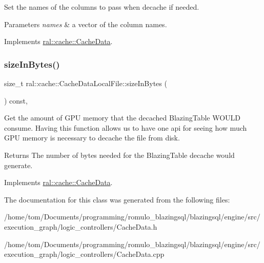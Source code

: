 Set the names of the columns to pass when decache if needed. 
\begin{DoxyParams}{Parameters}
{\em names} & a vector of the column names. \\
\hline
\end{DoxyParams}


Implements \hyperlink{classral_1_1cache_1_1CacheData_a3bb1623a4266ba7c961d325023ff13c6}{ral\+::cache\+::\+Cache\+Data}.

\mbox{\label{classral_1_1cache_1_1CacheDataLocalFile_ab0853eca16df1149f4ac0efbf3faa556}} 
\subsubsection{\texorpdfstring{size\+In\+Bytes()}{sizeInBytes()}}
{\footnotesize\ttfamily size\+\_\+t ral\+::cache\+::\+Cache\+Data\+Local\+File\+::size\+In\+Bytes (\begin{DoxyParamCaption}{ }\end{DoxyParamCaption}) const\hspace{0.3cm}{\ttfamily [override]}, {\ttfamily [virtual]}}

Get the amount of G\+PU memory that the decached Blazing\+Table W\+O\+U\+LD consume. Having this function allows us to have one api for seeing how much G\+PU memory is necessary to decache the file from disk. \begin{DoxyReturn}{Returns}
The number of bytes needed for the Blazing\+Table decache would generate. 
\end{DoxyReturn}


Implements \hyperlink{classral_1_1cache_1_1CacheData_aaad8a726296574845f01f9380dcee40d}{ral\+::cache\+::\+Cache\+Data}.



The documentation for this class was generated from the following files\+:\begin{DoxyCompactItemize}
\item 
/home/tom/\+Documents/programming/romulo\+\_\+blazingsql/blazingsql/engine/src/execution\+\_\+graph/logic\+\_\+controllers/Cache\+Data.\+h\item 
/home/tom/\+Documents/programming/romulo\+\_\+blazingsql/blazingsql/engine/src/execution\+\_\+graph/logic\+\_\+controllers/Cache\+Data.\+cpp\end{DoxyCompactItemize}
